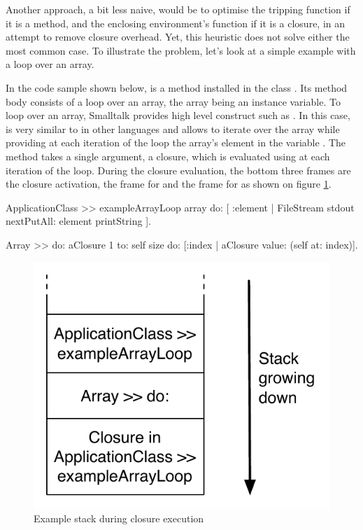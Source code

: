 \documentclass[a4paper,12pt,twoside]{../includes/ThesisStyle}
\begin{document}
Another approach, a bit less naive, would be to optimise the tripping function if it is a method, and the enclosing environment's function if it is a closure, in an attempt to remove closure overhead. Yet, this heuristic does not solve either the most common case. To illustrate the problem, let's look at a simple example with a loop over an array.

In the code sample shown below,  is a method installed in the class . Its method body consists of a loop over an array, the array being an instance variable. To loop over an array, Smalltalk provides high level construct such as . In this case,  is very similar to  in other languages and allows to iterate over the array while providing at each iteration of the loop the array's element in the variable . The  method takes a single argument, a closure, which is evaluated using  at each iteration of the loop. During the closure evaluation, the bottom three frames are the closure activation, the frame for  and the frame for  as shown on figure \ref{fig:ExampleLoopStack}.

\begin{code}
	ApplicationClass >> exampleArrayLoop
	    array do: [ :element | FileStream stdout nextPutAll: element printString ].
		
	Array >> do: aClosure
	    1 to: self size do: [:index | aClosure value: (self at: index)].
\end{code}

\begin{figure}[h!]
    \begin{center}
        \includegraphics[width=0.45\linewidth]{ExampleLoopStack}
        \caption{Example stack during closure execution}
        \label{fig:ExampleLoopStack}
    \end{center}
\end{figure}
\end{document}
